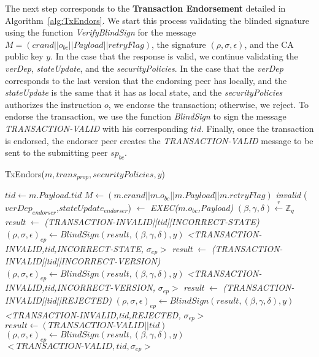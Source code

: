 \documentclass[conference]{llncs}
\begin{document}
The next step corresponds to the \textbf{Transaction Endorsement} detailed in Algorithm~\ref{alg:TxEndors}. We start this process validating the blinded signature using the function \textit{VerifyBlindSign} for the message $M=(crand\vert\vert o_{bc} \vert\vert Payload \vert\vert retryFlag)$, the signature $(\rho,\sigma,\epsilon)$, and the CA public key $y$. In the case that the response is valid, we continue validating the \textit{verDep}, \textit{stateUpdate}, and the \textit{securityPolicies}. In the case that the \textit{verDep} corresponds to the last version that the endorsing peer has locally, and the \textit{stateUpdate} is the same that it has as local state, and the \textit{securityPolicies} authorizes the instruction $o$, we endorse the transaction; otherwise, we reject. To endorse the transaction, we use the function \textit{BlindSign} to sign the message \textit{TRANSACTION-VALID} with his corresponding $tid$. Finally, once the transaction is endorsed, the endorser peer creates the \textit{TRANSACTION-VALID} message to be sent to the submitting peer $sp_{bc}$.

\begin{algorithm}[ht]
\caption{TxEndors($m,trans_{prop},securityPolicies,y$)}
\label{alg:TxEndors}
\begin{algorithmic}[1]
\STATE $tid \gets m.Payload.tid$
\STATE $M \gets (m.crand\vert\vert m.o_{bc} \vert\vert m.Payload \vert\vert m.retryFlag)$
  \RETURN \emph{invalid} \ELSE
\STATE ($verDep_{endorser}$,$stateUpdate_{endorser}$) $\gets$  \emph{EXEC(}$m.o_{bc}$\emph{,Payload)} \ENDIF
\STATE $(\beta,\gamma,\delta)\xleftarrow[]{r}\mathbb{Z}_q$  
\STATE \emph{result} $\gets$ \emph{(\textit{TRANSACTION-INVALID}||tid||\textit{INCORRECT-STATE})}
\STATE $(\rho,\sigma,\epsilon)_{ep} \gets BlindSign(result,(\beta,\gamma,\delta),y)$
\RETURN \emph{<\textit{TRANSACTION-INVALID},tid,\textit{INCORRECT-STATE},} $\sigma_{ep}>$ 
\STATE \emph{result} $\gets$ \emph{(\textit{TRANSACTION-INVALID}||tid||\textit{INCORRECT-VERSION})}
\STATE $(\rho,\sigma,\epsilon)_{ep} \gets BlindSign(result,(\beta,\gamma,\delta),y)$
\RETURN \emph{<\textit{TRANSACTION-INVALID},tid,\textit{INCORRECT-VERSION},} $\sigma_{ep}>$ 
\STATE \emph{result} $\gets$ \emph{(\textit{TRANSACTION-INVALID}||tid||\textit{REJECTED})}
\STATE $(\rho,\sigma,\epsilon)_{ep} \gets BlindSign(result,(\beta,\gamma,\delta),y)$
\RETURN \emph{<\textit{TRANSACTION-INVALID},tid,\textit{REJECTED},} $\sigma_{ep}>$
\ELSE  
\STATE $result \gets (\textit{TRANSACTION-VALID}||tid)$
\STATE $(\rho,\sigma,\epsilon)_{ep} \gets BlindSign(result,(\beta,\gamma,\delta),y)$
\RETURN $<\textit{TRANSACTION-VALID},tid,\sigma_{ep}>$
\ENDIF
\end{algorithmic}
\end{algorithm}
\end{document}
